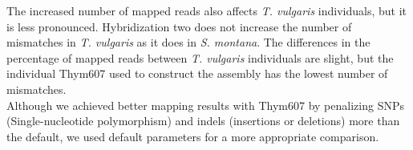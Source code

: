 The increased number of mapped reads also affects \textit{T. vulgaris} individuals, but it is less pronounced. Hybridization two does not increase the number of mismatches in \textit{T. vulgaris} as it does in \textit{S. montana}. The differences in the percentage of mapped reads between \textit{T. vulgaris} individuals are slight, but the individual Thym607 used to construct the assembly has the lowest number of mismatches.\\

Although we achieved better mapping results with Thym607 by penalizing SNPs (Single-nucleotide polymorphism) and indels (insertions or deletions) more than the default, we used default parameters for a more appropriate comparison.\\ 